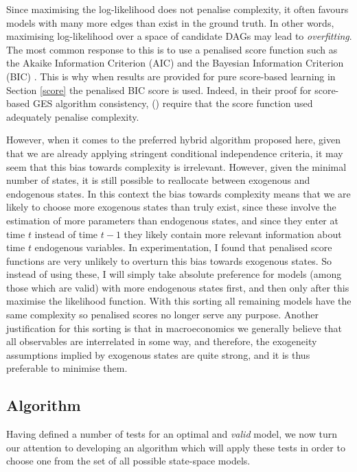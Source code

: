 \documentclass{article}
\begin{document}
Since maximising the log-likelihood does not penalise complexity, it often favours models with many more edges than exist in the ground truth. In other words, maximising log-likelihood over a space of candidate DAGs may lead to \textit{overfitting}. The most common response to this is to use a penalised score function such as the Akaike Information Criterion (AIC) \parencite{akaike1974new} and the Bayesian Information Criterion (BIC) \parencite{schwarz1978estimating}. This is why when results are provided for pure score-based learning in Section \ref{score} the penalised BIC score is used. Indeed, in their proof for score-based GES algorithm consistency, \citeauthor{chickering2002optimal} (\citeyear{chickering2002optimal}) require that the score function used adequately penalise complexity.

However, when it comes to the preferred hybrid algorithm proposed here, given that we are already applying stringent conditional independence criteria, it may seem that this bias towards complexity is irrelevant. However, given the minimal number of states, it is still possible to reallocate between exogenous and endogenous states. In this context the bias towards complexity means that we are likely to choose more exogenous states than truly exist, since these involve the estimation of more parameters than endogenous states, and since they enter at time $t$ instead of time $t-1$ they likely contain more relevant information about time $t$ endogenous variables. In experimentation, I found that penalised score functions are very unlikely to overturn this bias towards exogenous states. So instead of using these, I will simply take absolute preference for models (among those which are valid) with more endogenous states first, and then only after this maximise the likelihood function. With this sorting all remaining models have the same complexity so penalised scores no longer serve any purpose. Another justification for this sorting is that in macroeconomics we generally believe that all observables are interrelated in some way, and therefore, the exogeneity assumptions implied by exogenous states are quite strong, and it is thus preferable to minimise them. 

\subsection{Algorithm} \label{algo}

Having defined a number of tests for an optimal and \textit{valid} model, we now turn our attention to developing an algorithm which will apply these tests in order to choose one from the set of all possible state-space models.
\end{document}
